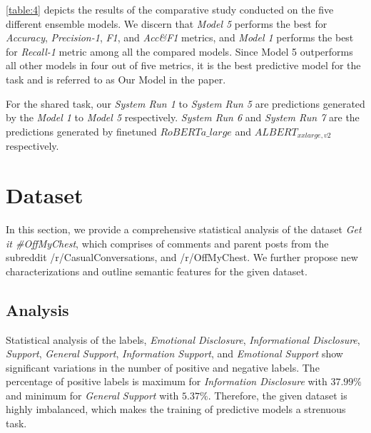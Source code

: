 \documentclass[runningheads]{llncs}
\begin{document}
\autoref{table:4} depicts the results of the comparative study conducted on the five different ensemble models. We discern that \textit{Model 5} performs the best for \textit{Accuracy}, \textit{Precision-1}, \textit{F1}, and \textit{Acc\&F1} metrics, and \textit{Model 1} performs the best for \textit{Recall-1} metric among all the compared models. Since Model 5 outperforms all other models in four out of five metrics, it is the best predictive model for the task and is referred to as Our Model in the paper.

For the shared task, our \textit{System Run 1} to \textit{System Run 5} are predictions generated by the \textit{Model 1} to \textit{Model 5} respectively. \textit{System Run 6} and \textit{System Run 7} are the predictions generated by finetuned $RoBERTa\_{large}$ and $ALBERT_{xxlarge,v2}$ respectively.


\section{Dataset}
In this section, we provide a comprehensive statistical analysis of the dataset \textit{Get it \#OffMyChest}, which comprises of comments and parent posts from the subreddit /r/CasualConversations, and /r/OffMyChest. We further propose new characterizations and outline semantic features for the given dataset. 

\subsection{Analysis}
Statistical analysis of the labels, \textit{Emotional Disclosure}, \textit{Informational Disclosure}, \textit{Support}, \textit{General Support}, \textit{Information Support}, and \textit{Emotional Support} show significant variations in the number of positive and negative labels. The percentage of positive labels is maximum for \textit{Information Disclosure} with $37.99\%$ and minimum for \textit{General Support} with $5.37\%$. Therefore, the given dataset is highly imbalanced, which makes the training of predictive models a strenuous task.
\end{document}
